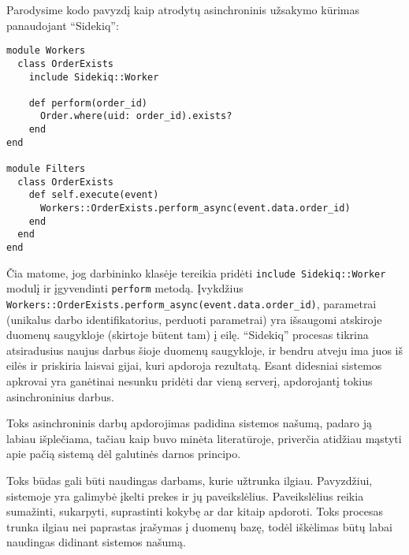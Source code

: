 Parodysime kodo pavyzdį kaip atrodytų asinchroninis užsakymo kūrimas panaudojant ``Sidekiq'':

\begin{lstlisting}
module Workers
  class OrderExists
    include Sidekiq::Worker

    def perform(order_id)
      Order.where(uid: order_id).exists?
    end
end

module Filters
  class OrderExists
    def self.execute(event)
      Workers::OrderExists.perform_async(event.data.order_id)
    end
  end
end
\end{lstlisting}

Čia matome, jog darbininko klasėje tereikia pridėti \lstinline|include Sidekiq::Worker| modulį ir įgyvendinti \lstinline|perform| metodą. Įvykdžius \lstinline|Workers::OrderExists.perform_async(event.data.order_id)|, parametrai (unikalus darbo identifikatorius, perduoti parametrai) yra išsaugomi atskiroje duomenų saugykloje (skirtoje būtent tam) į eilę. ``Sidekiq'' procesas tikrina atsiradusius naujus darbus šioje duomenų saugykloje, ir bendru atveju ima juos iš eilės ir priskiria laisvai gijai, kuri apdoroja rezultatą. Esant didesniai sistemos apkrovai yra ganėtinai nesunku pridėti dar vieną serverį, apdorojantį tokius asinchroninius darbus.

Toks asinchroninis darbų apdorojimas padidina sistemos našumą, padaro ją labiau išplečiama, tačiau kaip buvo minėta literatūroje, priverčia atidžiau mąstyti apie pačią sistemą dėl galutinės darnos principo.

Toks būdas gali būti naudingas darbams, kurie užtrunka ilgiau. Pavyzdžiui, sistemoje yra galimybė įkelti prekes ir jų paveikslėlius. Paveikslėlius reikia sumažinti, sukarpyti, suprastinti kokybę ar dar kitaip apdoroti. Toks procesas trunka ilgiau nei paprastas įrašymas į duomenų bazę, todėl iškėlimas būtų labai naudingas didinant sistemos našumą.



